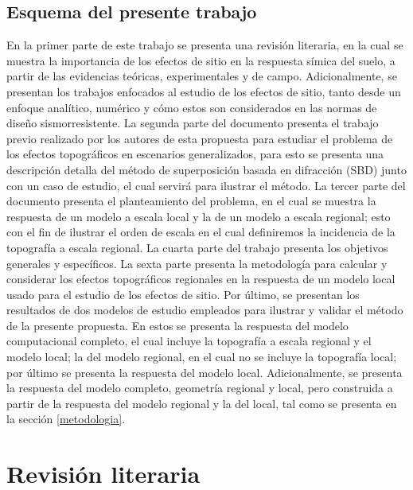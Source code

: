 \documentclass[spanish,letterpaper,12pt,twoside,openany]{article}
\begin{document}
\subsection{Esquema del presente trabajo}
%
En la primer parte de este trabajo se presenta una revisión literaria, en la cual se muestra la importancia de los efectos de sitio en la respuesta símica del suelo, a partir de las evidencias teóricas, experimentales y de campo. Adicionalmente, se presentan los trabajos enfocados al estudio de los efectos de sitio, tanto desde un enfoque analítico, numérico y cómo estos son considerados en las normas de diseño sismorresistente. La segunda parte del documento presenta el trabajo previo realizado por los autores de esta propuesta para estudiar el problema de los efectos topográficos en escenarios generalizados, para esto se presenta una descripción detalla del método de superposición basada en difracción (SBD) \citep{Jaramillo2013} junto con un caso de estudio, el cual servirá para ilustrar el método. La tercer parte del documento presenta el planteamiento del problema, en el cual se muestra la respuesta de un modelo a escala local y la de un modelo a escala regional; esto con el fin de ilustrar el orden de escala en el cual definiremos la incidencia de la topografía a escala regional. La cuarta parte del trabajo presenta los objetivos generales y específicos. La sexta parte presenta la metodología para calcular y considerar los efectos topográficos regionales en la respuesta de un modelo local usado para el estudio de los efectos de sitio. Por último, se presentan los resultados de dos modelos de estudio empleados para ilustrar y validar el método de la presente propuesta. En estos se presenta la respuesta del modelo computacional completo, el cual incluye la topografía a escala regional y el modelo local; la del modelo regional, en el cual no se incluye la topografía local; por último se presenta la respuesta del modelo local. Adicionalmente, se presenta la respuesta del modelo completo, geometría regional y local, pero construida a partir de la respuesta del modelo regional y la del local, tal como se presenta en la sección \ref{metodologia}.
%
%
%
%
%
\newpage
%
\section{Revisión literaria}
%
%
\end{document}
